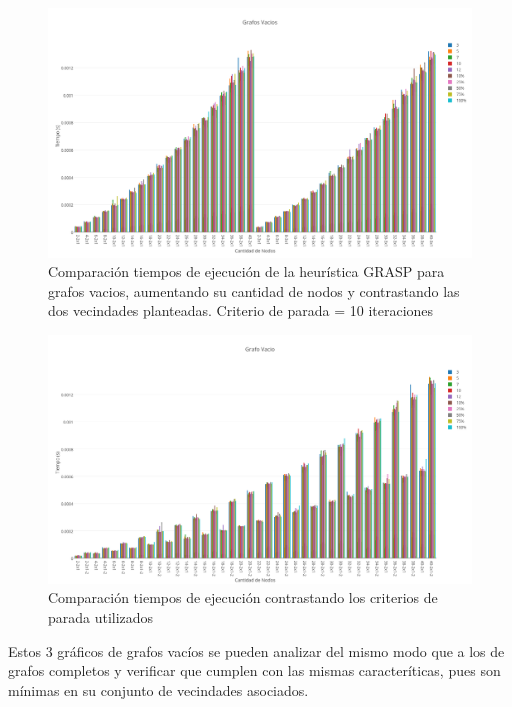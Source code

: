  \begin{figure}[h!]
   \begin{center}
 	\includegraphics[scale=0.35]{imagenes/grasp/vacio-10repes.png}
 	\caption{Comparaci\'on tiempos de ejecuci\'on de la heur\'istica GRASP para grafos vacios, aumentando su cantidad de nodos y contrastando las dos vecindades planteadas. Criterio de parada = 10 iteraciones}
   \end{center}
 \end{figure}

  \begin{figure}[h!]
   \begin{center}
 	\includegraphics[scale=0.35]{imagenes/grasp/vacio-5vs10.png}
 	\caption{Comparaci\'on tiempos de ejecuci\'on contrastando los criterios de parada utilizados}
   \end{center}
 \end{figure}
\newpage

Estos 3 gr\'aficos de grafos vac\'ios se pueden analizar del mismo modo que a los de grafos completos y verificar que cumplen con las mismas caracter\'iticas, pues son m\'inimas en su conjunto de vecindades asociados.

